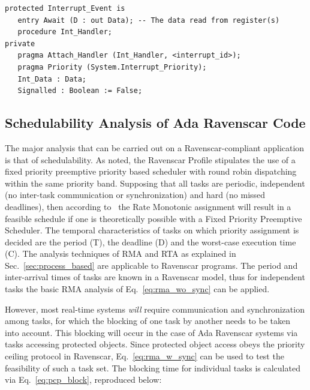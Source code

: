 \begin{minipage}{\listingwidth}
\lstset{language=ada,
  numbers=left,
  numberstyle=\tiny
}
\lstset{numbers=none}
\begin{center}
\begin{lstlisting}[label=lst:interrupt_po, caption=A protected object
    attached to an interrupt]
protected Interrupt_Event is
   entry Await (D : out Data); -- The data read from register(s)
   procedure Int_Handler;
private
   pragma Attach_Handler (Int_Handler, <interrupt_id>);
   pragma Priority (System.Interrupt_Priority);
   Int_Data : Data;
   Signalled : Boolean := False;
\end{lstlisting}
\end{center}
\end{minipage}

\subsection{Schedulability Analysis of Ada Ravenscar Code}
The major analysis that can be carried out on a Ravenscar-compliant
application is that of schedulability. As noted, the Ravenscar Profile
stipulates the use of a fixed priority preemptive priority based
scheduler with round robin dispatching within the same priority
band. Supposing that all tasks are periodic, independent (no
inter-task communication or synchronization) and hard (no missed
deadlines), then according to~\cite{liu@jacm73} the Rate Monotonic
assignment will result in a feasible schedule if one is theoretically
possible with a Fixed Priority Preemptive Scheduler. The temporal
characteristics of tasks on which priority assignment is decided are
the period (T), the deadline (D) and the worst-case execution time
(C). The analysis techniques of RMA and RTA as explained in
Sec.~\ref{sec:process_based} are applicable to Ravenscar programs. The
period and inter-arrival times of tasks are known in a Ravenscar
model, thus for independent tasks the basic RMA analysis of
Eq.~\ref{eq:rma_wo_sync} can be applied.

However, most real-time systems \emph{will} require communication and
synchronization among tasks, for which the blocking of one task by
another needs to be taken into account. This blocking will occur in
the case of Ada Ravenscar systems via tasks accessing protected
objects. Since protected object access obeys the priority ceiling
protocol in Ravenscar, Eq.~\ref{eq:rma_w_sync} can be used to test the
feasibility of such a task set. The blocking time for individual tasks
is calculated via Eq.~\ref{eq:pcp_block}, reproduced below:

